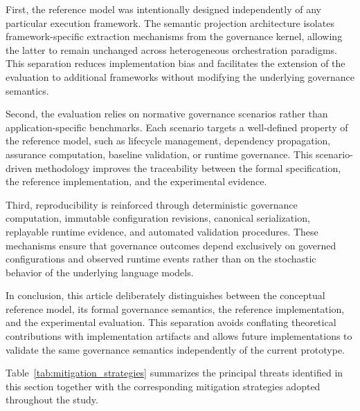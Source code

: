 \documentclass[10pt]{article}
\begin{document}
First, the reference model was intentionally designed independently of any particular execution framework. The semantic projection architecture isolates framework-specific extraction mechanisms from the governance kernel, allowing the latter to remain unchanged across heterogeneous orchestration paradigms. This separation reduces implementation bias and facilitates the extension of the evaluation to additional frameworks without modifying the underlying governance semantics.

Second, the evaluation relies on normative governance scenarios rather than application-specific benchmarks. Each scenario targets a well-defined property of the reference model, such as lifecycle management, dependency propagation, assurance computation, baseline validation, or runtime governance. This scenario-driven methodology improves the traceability between the formal specification, the reference implementation, and the experimental evidence.

Third, reproducibility is reinforced through deterministic governance computation, immutable configuration revisions, canonical serialization, replayable runtime evidence, and automated validation procedures. These mechanisms ensure that governance outcomes depend exclusively on governed configurations and observed runtime events rather than on the stochastic behavior of the underlying language models.

In conclusion, this article deliberately distinguishes between the conceptual reference model, its formal governance semantics, the reference implementation, and the experimental evaluation. This separation avoids conflating theoretical contributions with implementation artifacts and allows future implementations to validate the same governance semantics independently of the current prototype.

Table~\ref{tab:mitigation_strategies} summarizes the principal threats identified in this section together with the corresponding mitigation strategies adopted throughout the study.
\end{document}
